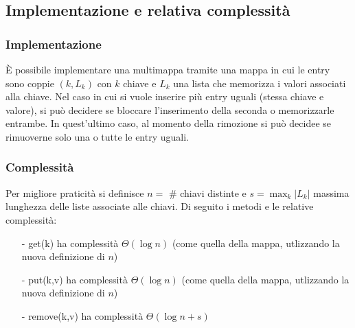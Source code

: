 \documentclass[a4paper]{article}
\begin{document}
\subsection{Implementazione e relativa complessità}
\subsubsection*{Implementazione}
È possibile implementare una multimappa tramite una mappa in cui le entry sono coppie \((k, L_k)\) con \(k\) chiave e \(L_k\) una
lista che memorizza i valori associati alla chiave. Nel caso in cui si vuole inserire più entry uguali (stessa chiave e valore),
si può decidere se bloccare l'inserimento della seconda o memorizzarle entrambe. In quest'ultimo caso, al momento della rimozione
si può decidee se rimuoverne solo una o tutte le entry uguali.

\subsubsection*{Complessità}
Per migliore praticità si definisce \(n =\) \# chiavi distinte e \(s = \max_k |L_k|\) massima lunghezza delle liste associate
alle chiavi. Di seguito i metodi e le relative complessità:
\begin{itemize}[topsep=3pt, itemsep=0pt]
	\item[-] get(k) ha complessità \(\Theta(\log n)\) (come quella della mappa, utlizzando la nuova definizione di \(n\))
	\item[-] put(k,v) ha complessità \(\Theta(\log n)\) (come quella della mappa, utlizzando la nuova definizione di \(n\))
	\item[-] remove(k,v) ha complessità \(\Theta(\log n + s)\)
\end{itemize}
\end{document}
